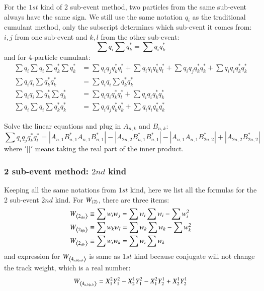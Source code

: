 For the $1st$ kind of 2 sub-event method, two particles from the same sub-event always have the same sign. We still use the same notation $q_{i}$ as the traditional cumulant method, only the subscript determines which sub-event it comes from: $i,j$ from one sub-event and $k,l$ from the other sub-event:
\begin{equation}
\sum q_{i}^{} \sum q_{k}^{*} = \sum q_{i}^{}q_{k}^{*}
\end{equation}
and for 4-particle cumulant:
\begin{equation}
\begin{split}
\sum q_{i}^{} \sum q_{i}^{} \sum q_{k}^{*} \sum q_{k}^{*} &= \sum q_{i}^{}q_{j}^{}q_{k}^{*}q_{l}^{*} + \sum q_{i}^{}q_{i}^{}q_{k}^{*}q_{l}^{*} + \sum q_{i}^{}q_{j}^{}q_{k}^{*}q_{k}^{*} + \sum q_{i}^{}q_{i}^{}q_{k}^{*}q_{k}^{*} \\
\sum q_{i}^{}q_{i}^{} \sum q_{k}^{*}q_{k}^{*} &= \sum q_{i}^{}q_{i}^{} \sum q_{k}^{*}q_{k}^{*} \\
\sum q_{i}^{}q_{i}^{} \sum q_{k}^{*} \sum q_{k}^{*} &= \sum q_{i}^{}q_{i}^{}q_{k}^{*}q_{l}^{*} + \sum q_{i}^{}q_{i}^{}q_{k}^{*}q_{k}^{*} \\
\sum q_{i}^{} \sum q_{i}^{} \sum q_{k}^{*}q_{k}^{*} &= \sum q_{i}^{}q_{j}^{}q_{k}^{*}q_{k}^{*} + \sum q_{i}^{}q_{i}^{}q_{k}^{*}q_{k}^{*}
\end{split}
\end{equation}

Solve the linear equations and plug in $A_{n,k}$ and $B_{n,k}$:
\begin{equation}
\sum q_{i}^{}q_{j}^{}q_{k}^{*}q_{l}^{*} = |A_{n,1}^{}B_{n,1}^{*}A_{n,1}^{}B_{n,1}^{*}|-|A_{2n,2}^{}B_{n,1}^{*}B_{n,1}^{*}|-|A_{n,1}^{}A_{n,1}^{}B_{2n,2}^{*}|+|A_{2n,2}^{}B_{2n,2}^{*}|
\end{equation}
where $'|  |'$ means taking the real part of the inner product.

\subsubsection{2 sub-event method: $2nd$ kind}
Keeping all the same notations from $1st$ kind, here we list all the formulas for the 2 sub-event $2nd$ kind.
For $W_{\left\langle 2\right\rangle}$, there are three items:
\begin{equation}
\begin{split}
W_{\left\langle 2_{a|a}\right\rangle} &\equiv \sum w_{i}w_{j} = \sum w_{i} \sum w_{i} - \sum w_{i}^{2} \\
W_{\left\langle 2_{b|b}\right\rangle} &\equiv \sum w_{k}w_{l} = \sum w_{k} \sum w_{k} - \sum w_{k}^{2} \\
W_{\left\langle 2_{a|b}\right\rangle} &\equiv \sum w_{i}w_{k} = \sum w_{i} \sum w_{k}
\end{split}
\end{equation}
and expression for $W_{\left\langle 4_{a,b|a,b}\right\rangle}$ is same as $1st$ kind because conjugate will not change the track weight, which is a real number:
\begin{equation}
W_{\left\langle 4_{a,b|a,b}\right\rangle} = X_{1}^{2}Y_{1}^{2}-X_{2}^{1}Y_{1}^{2}-X_{1}^{2}Y_{2}^{1}+X_{2}^{1}Y_{2}^{1}
\end{equation}


